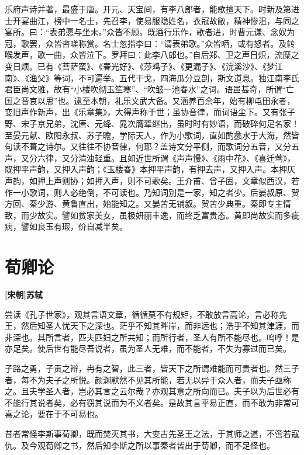 \documentclass[UTF8,titlepage,oneside]{ctexbook}
\begin{document}
乐府声诗并著，最盛于唐。开元、天宝间，有李八郎者，能歌擅天下。时新及第进士开宴曲江，榜中一名士，先召李，使易服隐姓名，衣冠故敝，精神惨沮，与同之宴所。曰：“表弟愿与坐末。”众皆不顾。既酒行乐作，歌者进，时曹元谦、念奴为冠，歌罢，众皆咨嗟称赏。名士忽指李曰：“请表弟歌。”众皆哂，或有怒者。及转喉发声，歌一曲，众皆泣下。罗拜曰：此李八郎也。”自后郑、卫之声日炽，流糜之变日烦。已有《菩萨蛮》、《春光好》、《莎鸡子》、《更漏子》、《浣溪沙》、《梦江南》、《渔父》等词，不可遍举。五代干戈，四海瓜分豆剖，斯文道息。独江南李氏君臣尚文雅，故有“小楼吹彻玉笙寒”、“吹皱一池春水”之词。语虽甚奇，所谓“亡国之音哀以思”也。逮至本朝，礼乐文武大备。又涵养百余年，始有柳屯田永者，变旧声作新声，出《乐章集》，大得声称于世；虽协音律，而词语尘下。又有张子野、宋子京兄弟，沈唐、元绛、晁次膺辈继出，虽时时有妙语，而破碎何足名家！至晏元献、欧阳永叔、苏子瞻，学际天人，作为小歌词，直如酌蠡水于大海，然皆句读不葺之诗尔。又往往不协音律，何耶？盖诗文分平侧，而歌词分五音，又分五声，又分六律，又分清浊轻重。且如近世所谓《声声慢》、《雨中花》、《喜迁莺》，既押平声韵，又押入声韵；《玉楼春》本押平声韵，有押去声，又押入声。本押仄声韵，如押上声则协；如押入声，则不可歌矣。王介甫、曾子固，文章似西汉，若作一小歌词，则人必绝倒，不可读也。乃知词别是一家，知之者少。后晏叔原、贺方回、秦少游、黄鲁直出，始能知之。又晏苦无铺叙。贺苦少典重。秦即专主情致，而少故实。譬如贫家美女，虽极妍丽丰逸，而终乏富贵态。黄即尚故实而多疵病，譬如良玉有瑕，价自减半矣。



\chapter*{荀卿论}
\begin{center}
	\textbf{[宋朝]苏轼}
\end{center}

尝读《孔子世家》，观其言语文章，循循莫不有规矩，不敢放言高论，言必称先王，然后知圣人忧天下之深也。茫乎不知其畔岸，而非远也；浩乎不知其津涯，而非深也。其所言者，匹夫匹妇之所共知；而所行者，圣人有所不能尽也。呜呼！是亦足矣。使后世有能尽吾说者，虽为圣人无难，而不能者，不失为寡过而已矣。


子路之勇，子贡之辩，冉有之智，此三者，皆天下之所谓难能而可贵者也。然三子者，每不为夫子之所悦。颜渊默然不见其所能，若无以异于众人者，而夫子亟称之。且夫学圣人者，岂必其言之云尔哉？亦观其意之所向而已。夫子以为后世必有不能行其说者矣，必有窃其说而为不义者矣。是故其言平易正直，而不敢为非常可喜之论，要在于不可易也。


昔者常怪李斯事荀卿，既而焚灭其书，大变古先圣王之法，于其师之道，不啻若寇仇。及今观荀卿之书，然后知李斯之所以事秦者皆出于荀卿，而不足怪也。
\end{document}
